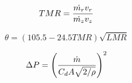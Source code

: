 $$
TMR = {\dot{m_r} v_r \over \dot{m_z} v_z}
$$

$$
\theta = (105.5 - 24.5TMR)\sqrt{LMR}
$$

$$
\Delta P = \left({\dot{m} \over C_d A \sqrt{2/\rho}}\right)^2
$$
\bye
